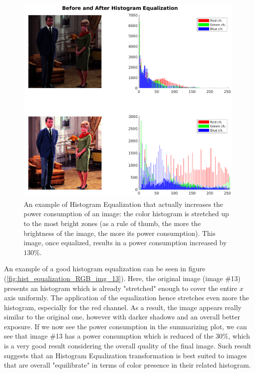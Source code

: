 \documentclass[a4paper]{article}
\begin{document}
            \begin{figure}[htp]
                \centering
                \includegraphics[width=0.6 \columnwidth]{./screenshots/hist_equalization_RGB_img_2}
                \caption{
                        \label{fig:hist_equalization_RGB_img_2}
                        An example of Histogram Equalization that actually increases the power consumption of an image: the color histogram is stretched up to the most bright zones (as a rule of thumb, the more the brightness of the image, the more its power consumption). This image, once equalized, results in a power consumption increased by $130\%$.
                }
            \end{figure}

            An example of a good histogram equalization can be seen in figure (\ref{fig:hist_equalization_RGB_img_13}). Here, the original image (image \#13) presents an histogram which is already "stretched" enough to cover the entire $x$ axis uniformly. The application of the equalization hence stretches even more the histogram, especially for the red channel. As a result, the image appears really similar to the original one, however with darker shadows and an overall better exposure. If we now see the power consumption in the summarizing plot, we can see that image \#13 has a power consumption which is reduced of the $30\%$, which is a very good result considering the overall quality of the final image. Such result suggests that an Histogram Equalization transformation is best suited to images that are overall "equilibrate" in terms of color presence in their related histogram.
\end{document}
